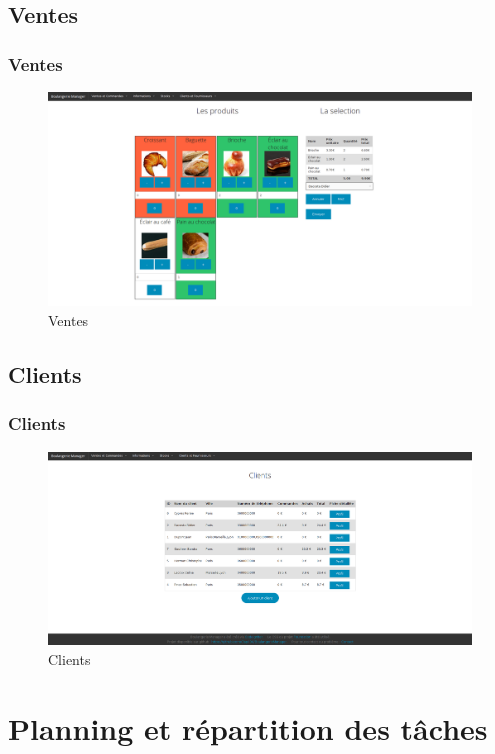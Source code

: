 \subsection{Ventes}
\begin{frame}
\frametitle{Ventes}
\begin{figure}[h!]
    \centerline{\includegraphics[width=1\textwidth]{images/ventes.png}}
    \caption{Ventes}
\end{figure}
\end{frame}

\subsection{Clients}
\begin{frame}
\frametitle{Clients}
\begin{figure}[h!]
    \centerline{\includegraphics[width=1\textwidth]{images/clients.png}}
    \caption{Clients}
\end{figure}
\end{frame}


    \section{Planning et répartition des tâches}


